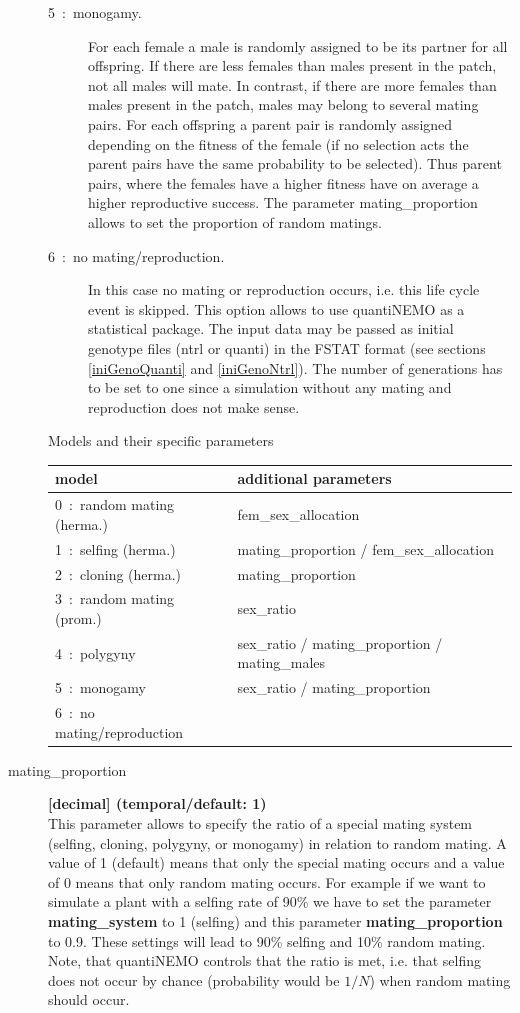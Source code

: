 \documentclass[letterpaper,12pt,oneside]{book}
\begin{document}
\begin{description}
\begin{description}
\item [5~:~monogamy.] For each female a male is randomly assigned to be its partner for all offspring. If there are less females than males present in the patch, not all males will mate. In contrast, if there are more females than males present in the patch, males may belong to several mating pairs. For each offspring a parent pair is randomly assigned depending on the fitness of the female (if no selection acts the parent pairs have the same probability to be selected). Thus parent pairs, where the females have a higher fitness have on average a higher reproductive success. The parameter \textsf{mating\_proportion} allows to set the proportion of random matings.

\item [6~:~no mating/reproduction.] In this case no mating or reproduction occurs, i.e. this life cycle event is skipped. This option allows to use quantiNEMO as a statistical package. The input data may be passed as initial genotype files (ntrl or quanti) in the FSTAT format (see sections \ref{iniGenoQuanti} and \ref{iniGenoNtrl}). The number of generations has to be set to one since a simulation without any mating and reproduction does not make sense.

\end{description}

Models and their specific parameters\\
\begin{tabular*}{0.92\textwidth}{ll}
 \hline model & additional parameters \\ 
 \hline
 0~:~random mating (herma.)& fem\_sex\_allocation\\
 1~:~selfing (herma.)      & mating\_proportion / fem\_sex\_allocation\\
 2~:~cloning (herma.)      & mating\_proportion\\
 3~:~random mating (prom.) & sex\_ratio\\
 4~:~polygyny              & sex\_ratio / mating\_proportion / mating\_males\\
 5~:~monogamy              & sex\_ratio / mating\_proportion\\
 6~:~no mating/reproduction & \\
 \hline
\end{tabular*}

\item[mating\_proportion\index{mating\_proportion}] \textbf{[decimal] (temporal/default: 1)}\\
This parameter allows to specify the ratio of a special mating system (selfing, cloning, polygyny, or monogamy) in relation to random mating. A value of 1 (default) means that only the special mating occurs and a value of 0 means that only random mating occurs. For example if we want to simulate a plant with a selfing rate of 90\% we have to set the parameter \textbf{mating\_system} to 1 (selfing) and this parameter \textbf{mating\_proportion} to 0.9. These settings will lead to 90\% selfing and 10\% random mating. Note, that quantiNEMO controls that the ratio is met, i.e. that selfing does not occur by chance (probability would be $1/N$) when random mating should occur.


\end{description}
\end{document}
